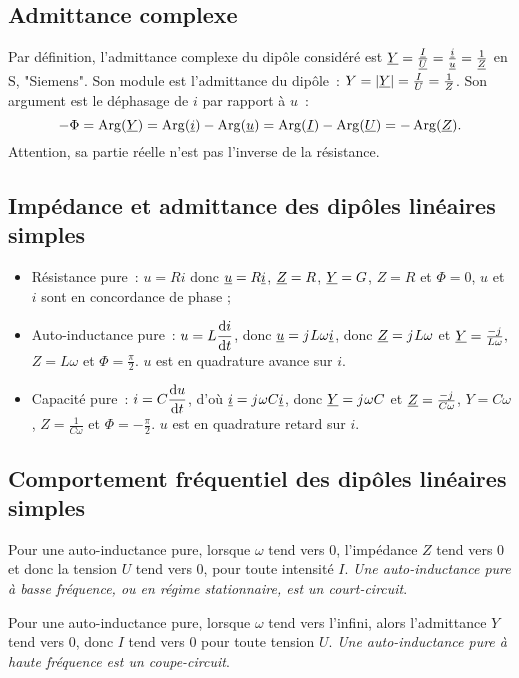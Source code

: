     \subsection{Admittance complexe}
        Par définition, l'admittance complexe du dipôle considéré est $\underline{Y} = \frac{\underline{I}}{\underline{U}}=\frac{\underline{i}}{\underline{u}}=\frac{1}{\underline{Z}}$ en $\si{\siemens}$, "Siemens". Son module est l'admittance du dipôle~: $Y = \left\lvert\underline{Y}\right\rvert = \frac{I}{U} = \frac{1}{Z}$. Son argument est le déphasage de $i$ par rapport à $u$~:
        \begin{equation}
            -\Phi = \operatorname{Arg}(\underline{Y}) = \operatorname{Arg}(\underline{i}) - \operatorname{Arg}(\underline{u}) = \operatorname{Arg}(\underline{I}) - \operatorname{Arg}(\underline{U}) = -\operatorname{Arg}(\underline{Z}).
        \end{equation}
        Attention, sa partie réelle n'est pas l'inverse de la résistance.
    \subsection{Impédance et admittance des dipôles linéaires simples}
        \begin{itemize}
            \item Résistance pure~: $u=Ri$ donc $\underline{u} = R \underline{i}$, $\underline{Z} =R$, $\underline{Y} = G$, $Z=R$ et $\Phi=0$, $u$ et $i$ sont en concordance de phase ;
            \item Auto-inductance pure~: $u=L\dfrac{\mathrm{d} i}{\mathrm{d} t}$, donc $\underline{u} = {j\mkern1mu} L \omega \underline{i}$, donc $\underline{Z} = {j\mkern1mu} L\omega$ et $\underline{Y} = \frac{-{j\mkern1mu}}{L\omega},$ $Z=L\omega$ et $\Phi=\frac{\pi}{2}$. $u$ est en quadrature avance sur $i$.
            \item Capacité pure~: $i=C\dfrac{\mathrm{d} u}{\mathrm{d} t}$, d'où $\underline{i} = {j\mkern1mu}\omega C \underline{i}$, donc $\underline{Y} = {j\mkern1mu}\omega C$ et $\underline{Z} = \frac{-{j\mkern1mu}}{C\omega}$, $Y=C\omega$, $Z=\frac{1}{C\omega}$ et $\Phi = -\frac{\pi}{2}$. $u$ est en quadrature retard sur $i$.
        \end{itemize}
    \subsection{Comportement fréquentiel des dipôles linéaires simples}
        Pour une auto-inductance pure, lorsque $\omega$ tend vers 0, l'impédance $Z$ tend vers 0 et donc la tension $U$ tend vers 0, pour toute intensité $I$. \emph{Une auto-inductance pure à basse fréquence, ou en régime stationnaire, est un court-circuit}.

        Pour une auto-inductance pure, lorsque $\omega$ tend vers l'infini, alors l'admittance $Y$ tend vers 0, donc $I$ tend vers 0 pour toute tension $U$. \emph{Une auto-inductance pure à haute fréquence est un coupe-circuit}.

